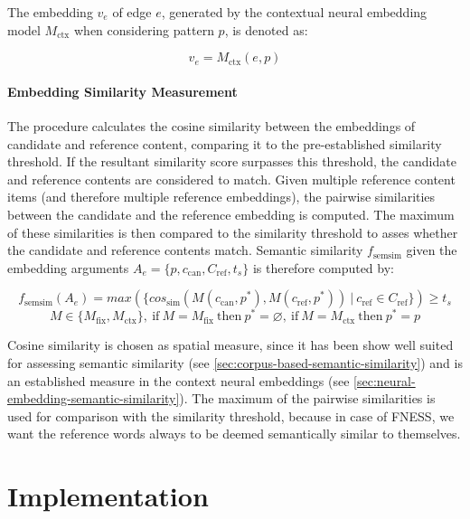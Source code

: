 \documentclass[11pt]{scrreprt}
\begin{document}
The embedding \(v_e\) of edge \(e\), generated by the contextual neural embedding model \(M_\text{ctx}\) when considering pattern \(p\), is denoted as:


\[v_e = M_\text{ctx}(e, p) \]

    
\subsubsection{Embedding Similarity Measurement}
The procedure calculates the cosine similarity between the embeddings of candidate and reference content, comparing it to the pre-established similarity threshold. If the resultant similarity score surpasses this threshold, the candidate and reference contents are considered to match. Given multiple reference content items (and therefore multiple reference embeddings), the pairwise similarities between the candidate and the reference embedding is computed. The maximum of these similarities is then compared to the similarity threshold to asses whether the candidate and reference contents match. Semantic similarity \(f_\text{semsim}\) given the embedding arguments \(A_e = \{p, c_\text{can}, C_\text{ref}, t_s\}\) is therefore computed by:

\[f_\text{semsim}(A_e) = max(\{cos_\text{sim}(M(c_\text{can}, p^*), M(c_\text{ref}, p^*))\ |\ c_\text{ref} \in C_\text{ref}\}) \geq t_s \]
\[M \in \{M_\text{fix}, M_\text{ctx}\},\ \text{if}\ M = M_\text{fix}\ \text{then}\ p^* = \varnothing,\ \text{if}\ M = M_\text{ctx}\ \text{then}\ p^* = p \]

Cosine similarity is chosen as spatial measure, since it has been show well suited for assessing semantic similarity (see \cref{sec:corpus-based-semantic-similarity}) and is an established measure in the context neural embeddings (see \cref{sec:neural-embedding-semantic-similarity}). The maximum of the pairwise similarities is used for comparison with the similarity threshold, because in case of FNESS, we want the reference words always to be deemed semantically similar to themselves. 





\chapter{Implementation}
\label{cha:implementation}
\end{document}
